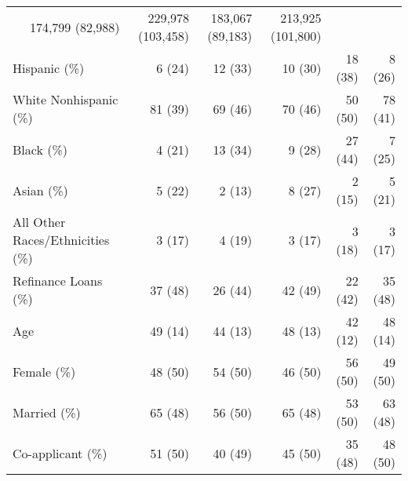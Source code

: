 \documentclass[11pt]{article}
\begin{document}
{\begin{table}[!h]
{\begin{tabular}{lccccc}
  \multicolumn{1}{r}{174,799 (82,988)} &
  \multicolumn{1}{r}{229,978 (103,458)} &
  \multicolumn{1}{r}{183,067 (89,183)} &
  \multicolumn{1}{r}{213,925 (101,800)} \\
\multicolumn{1}{l}{Hispanic (\%)} &
  \multicolumn{1}{r}{6 (24)} &
  \multicolumn{1}{r}{12 (33)} &
  \multicolumn{1}{r}{10 (30)} &
  \multicolumn{1}{r}{18 (38)} &
  \multicolumn{1}{r}{8 (26)} \\
\multicolumn{1}{l}{White Nonhispanic (\%)} &
  \multicolumn{1}{r}{81 (39)} &
  \multicolumn{1}{r}{69 (46)} &
  \multicolumn{1}{r}{70 (46)} &
  \multicolumn{1}{r}{50 (50)} &
  \multicolumn{1}{r}{78 (41)} \\
\multicolumn{1}{l}{Black (\%)} &
  \multicolumn{1}{r}{4 (21)} &
  \multicolumn{1}{r}{13 (34)} &
  \multicolumn{1}{r}{9 (28)} &
  \multicolumn{1}{r}{27 (44)} &
  \multicolumn{1}{r}{7 (25)} \\
\multicolumn{1}{l}{Asian (\%)} &
  \multicolumn{1}{r}{5 (22)} &
  \multicolumn{1}{r}{2 (13)} &
  \multicolumn{1}{r}{8 (27)} &
  \multicolumn{1}{r}{2 (15)} &
  \multicolumn{1}{r}{5 (21)} \\
\multicolumn{1}{l}{All Other Races/Ethnicities (\%)} &
  \multicolumn{1}{r}{3 (17)} &
  \multicolumn{1}{r}{4 (19)} &
  \multicolumn{1}{r}{3 (17)} &
  \multicolumn{1}{r}{3 (18)} &
  \multicolumn{1}{r}{3 (17)} \\
\multicolumn{1}{l}{Refinance Loans (\%)} &
  \multicolumn{1}{r}{37 (48)} &
  \multicolumn{1}{r}{26 (44)} &
  \multicolumn{1}{r}{42 (49)} &
  \multicolumn{1}{r}{22 (42)} &
  \multicolumn{1}{r}{35 (48)} \\
\multicolumn{1}{l}{Age} &
  \multicolumn{1}{r}{49 (14)} &
  \multicolumn{1}{r}{44 (13)} &
  \multicolumn{1}{r}{48 (13)} &
  \multicolumn{1}{r}{42 (12)} &
  \multicolumn{1}{r}{48 (14)} \\
\multicolumn{1}{l}{Female (\%)} &
  \multicolumn{1}{r}{48 (50)} &
  \multicolumn{1}{r}{54 (50)} &
  \multicolumn{1}{r}{46 (50)} &
  \multicolumn{1}{r}{56 (50)} &
  \multicolumn{1}{r}{49 (50)} \\
\multicolumn{1}{l}{Married (\%)} &
  \multicolumn{1}{r}{65 (48)} &
  \multicolumn{1}{r}{56 (50)} &
  \multicolumn{1}{r}{65 (48)} &
  \multicolumn{1}{r}{53 (50)} &
  \multicolumn{1}{r}{63 (48)} \\
\multicolumn{1}{l}{Co-applicant (\%)} &
  \multicolumn{1}{r}{51 (50)} &
  \multicolumn{1}{r}{40 (49)} &
  \multicolumn{1}{r}{45 (50)} &
  \multicolumn{1}{r}{35 (48)} &
  \multicolumn{1}{r}{48 (50)} \\



\end{tabular}}
\end{table}}
\end{document}
